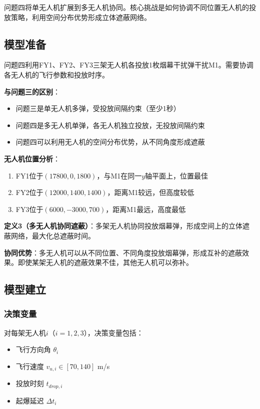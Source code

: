 \documentclass[12pt,a4paper]{article}
\begin{document}
问题四将单无人机扩展到多无人机协同。核心挑战是如何协调不同位置无人机的投放策略，利用空间分布优势形成立体遮蔽网络。

\subsection{模型准备}

问题四利用FY1、FY2、FY3三架无人机各投放1枚烟幕干扰弹干扰M1。需要协调各无人机的飞行参数和投放时序。

\textbf{与问题三的区别}：
\begin{itemize}
    \item 问题三是单无人机多弹，受投放间隔约束（至少1秒）
    \item 问题四是多无人机单弹，各无人机独立投放，无投放间隔约束
    \item 问题四可以利用无人机的空间分布优势，从不同角度形成遮蔽
\end{itemize}

\textbf{无人机位置分析}：
\begin{enumerate}
    \item FY1位于$(17800, 0, 1800)$，与M1在同一$y$轴平面上，位置最佳
    \item FY2位于$(12000, 1400, 1400)$，距离M1较远，但高度较低
    \item FY3位于$(6000, -3000, 700)$，距离M1最远，高度最低
\end{enumerate}

\textbf{定义3（多无人机协同遮蔽）}：多架无人机协同投放烟幕弹，形成空间上的立体遮蔽网络，最大化总遮蔽时间。

\textbf{协同优势}：多无人机可以从不同位置、不同角度投放烟幕弹，形成互补的遮蔽效果。即使某架无人机的遮蔽效果不佳，其他无人机可以弥补。

\subsection{模型建立}

\subsubsection{决策变量}

对每架无人机$i$（$i = 1, 2, 3$），决策变量包括：
\begin{itemize}
    \item 飞行方向角 $\theta_i$
    \item 飞行速度 $v_{u,i} \in [70, 140]$ m/s
    \item 投放时刻 $t_{drop,i}$
    \item 起爆延迟 $\Delta t_i$
\end{itemize}
\end{document}
